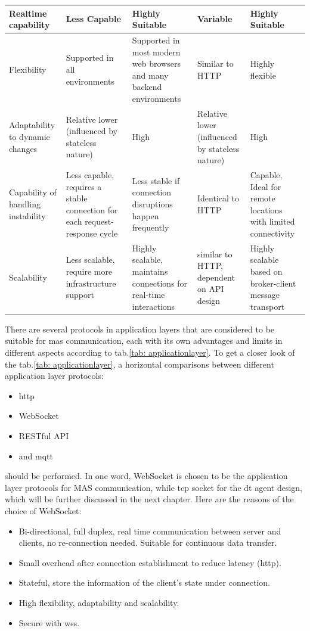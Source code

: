 \begin{table}
\begin{tabular}{|m{}|m{}|m{}|m{}|m{}|}
    Realtime capability & Less Capable & Highly Suitable & Variable & Highly Suitable \\ \hline
    Flexibility & Supported in all environments & Supported in most modern web browsers and many backend environments & Similar to HTTP & Highly flexible \\ \hline
    Adaptability to dynamic changes & Relative lower (influenced by stateless nature) & High & Relative lower (influenced by stateless nature) & High \\ \hline
    Capability of handling instability & Less capable, requires a stable connection for each request-response cycle & Less stable if connection disruptions happen frequently & Identical to HTTP & Capable, Ideal for remote locations with limited connectivity \\ \hline
    Scalability & Less scalable, require more infrastructure support & Highly scalable, maintains connections for real-time interactions & similar to HTTP, dependent on API design & Highly scalable based on broker-client message transport \\ \hline
    \end{tabular}
\end{table}

There are several protocols in application layers that are considered to be suitable for \gls{mas} communication, each with its own advantages and limits in different aspects according to tab.\ref{tab: applicationlayer}.
To get a closer look of the tab.\ref{tab: applicationlayer}, a horizontal comparisons between different application layer protocols: 

\begin{itemize}
    \item \gls{http}
    \item WebSocket
    \item RESTful API
    \item and \gls{mqtt}
\end{itemize}

should be performed. In one word, WebSocket is chosen to be the application layer protocols for MAS communication, while \gls{tcp} socket for the \gls{dt} agent design, which will be further discussed in the next chapter. Here are the reasons of the choice of WebSocket: 

\begin{itemize}
    \item Bi-directional, full duplex, real time communication between server and clients, no re-connection needed. Suitable for continuous data transfer.
    \item Small overhead after connection establishment to reduce latency (\gls{http}).
    \item Stateful, store the information of the client's state under connection.
    \item High flexibility, adaptability and scalability.
    \item Secure with wss.
\end{itemize}

